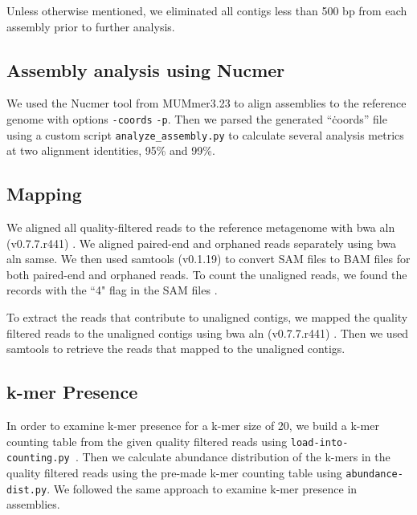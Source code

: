 \documentclass[10pt,a4paper,twocolumn]{article}
\begin{document}
Unless otherwise mentioned, we eliminated all contigs less than 500 bp from each assembly prior to further analysis.

\subsection*{Assembly analysis using Nucmer}

We used the Nucmer tool from MUMmer3.23 \cite{mummer3.0} to align assemblies to the reference genome with  options 
{\tt \--coords} {\tt -p}. Then we parsed the generated ``\.coords'' file using a custom script  {\tt{analyze\_assembly.py}} to calculate several analysis metrics at two alignment identities, 95\% and 99\%. 

\subsection*{Mapping}

We aligned all quality-filtered reads to the reference metagenome with bwa
aln (v0.7.7.r441) \cite{bwa}. We aligned paired-end and orphaned reads separately using bwa aln samse. We then used samtools (v0.1.19) \cite{sam-stools} to convert SAM files to BAM files for both paired-end and orphaned reads. To count the unaligned reads, we found the records with the ``4" flag in the SAM files \cite{sam-stools}. 
 

To extract the reads that contribute to unaligned contigs, we mapped the quality filtered reads to the unaligned contigs using bwa aln (v0.7.7.r441) \cite{bwa}. 
Then we used samtools to retrieve the reads that mapped to the unaligned contigs.





\subsection*{k-mer Presence}
In order to examine k-mer presence for a k-mer size of 20, we build a k-mer counting table from the given  quality filtered reads using {\tt{load-into-counting.py} }. Then we calculate abundance distribution of the k-mers in the quality filtered reads using the pre-made k-mer counting table using {\tt{abundance-dist.py}}. We followed the same approach to examine k-mer presence in assemblies. 
\end{document}
